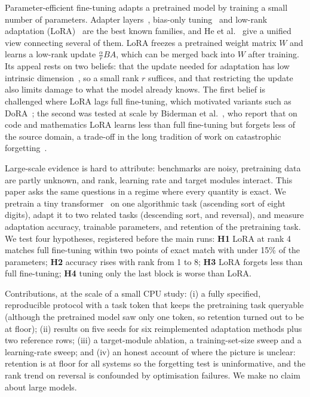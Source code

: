Parameter-efficient fine-tuning adapts a pretrained model by training a small number of parameters. Adapter layers~\cite{houlsby2019parameter}, bias-only tuning~\cite{benzaken2021bitfit} and low-rank adaptation (LoRA)~\cite{hu2021lora} are the best known families, and He et al.~\cite{he2021unified} give a unified view connecting several of them. LoRA freezes a pretrained weight matrix $W$ and learns a low-rank update $\frac{\alpha}{r}BA$, which can be merged back into $W$ after training. Its appeal rests on two beliefs: that the update needed for adaptation has low intrinsic dimension~\cite{aghajanyan2020intrinsic}, so a small rank $r$ suffices, and that restricting the update also limits damage to what the model already knows. The first belief is challenged where LoRA lags full fine-tuning, which motivated variants such as DoRA~\cite{liu2024dora}; the second was tested at scale by Biderman et al.~\cite{biderman2024lora}, who report that on code and mathematics LoRA learns less than full fine-tuning but forgets less of the source domain, a trade-off in the long tradition of work on catastrophic forgetting~\cite{kirkpatrick2016overcoming}.

Large-scale evidence is hard to attribute: benchmarks are noisy, pretraining data are partly unknown, and rank, learning rate and target modules interact. This paper asks the same questions in a regime where every quantity is exact. We pretrain a tiny transformer~\cite{vaswani2017attention} on one algorithmic task (ascending sort of eight digits), adapt it to two related tasks (descending sort, and reversal), and measure adaptation accuracy, trainable parameters, and retention of the pretraining task. We test four hypotheses, registered before the main runs: \textbf{H1} LoRA at rank 4 matches full fine-tuning within two points of exact match with under 15\% of the parameters; \textbf{H2} accuracy rises with rank from 1 to 8; \textbf{H3} LoRA forgets less than full fine-tuning; \textbf{H4} tuning only the last block is worse than LoRA.

Contributions, at the scale of a small CPU study: (i) a fully specified, reproducible protocol with a task token that keeps the pretraining task queryable (although the pretrained model saw only one token, so retention turned out to be at floor); (ii) results on five seeds for six reimplemented adaptation methods plus two reference rows; (iii) a target-module ablation, a training-set-size sweep and a learning-rate sweep; and (iv) an honest account of where the picture is unclear: retention is at floor for all systems so the forgetting test is uninformative, and the rank trend on reversal is confounded by optimisation failures. We make no claim about large models.
